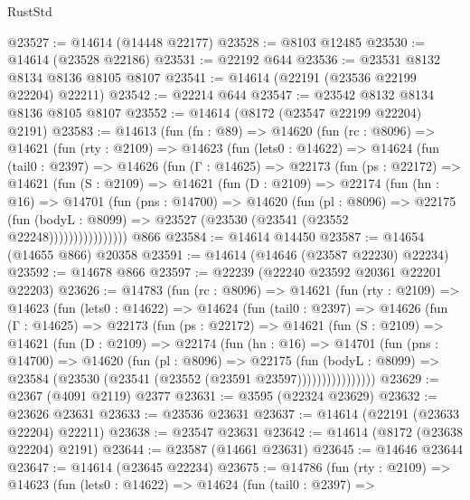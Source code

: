 \begin{lexlean}{RustStd}
\begin{coremodule}
@23527 := @14614 (@14448 @22177)
@23528 := @8103 @12485
@23530 := @14614 (@23528 @22186)
@23531 := @22192 @644
@23536 := @23531 @8132 @8134 @8136 @8105 @8107
@23541 := @14614 (@22191 (@23536 @22199 @22204) @22211)
@23542 := @22214 @644
@23547 := @23542 @8132 @8134 @8136 @8105 @8107
@23552 := @14614 (@8172 (@23547 @22199 @22204) @2191)
@23583 := @14613
    (fun (fn : @89) =>
    @14620
      (fun (rc : @8096) =>
      @14621
        (fun (rty : @2109) =>
        @14623
          (fun (lets0 : @14622) =>
          @14624
            (fun (tail0 : @2397) =>
            @14626
              (fun (Γ : @14625) =>
              @22173
                (fun (ps : @22172) =>
                @14621
                  (fun (S : @2109) =>
                  @14621
                    (fun (D : @2109) =>
                    @22174
                      (fun (hn : @16) =>
                      @14701
                        (fun (pns : @14700) =>
                        @14620
                          (fun (pl : @8096) =>
                          @22175
                            (fun (bodyL : @8099) =>
                            @23527 (@23530 (@23541 (@23552 @22248))))))))))))))))
    @866
@23584 := @14614 @14450
@23587 := @14654 (@14655 @866) @20358
@23591 := @14614 (@14646 (@23587 @22230) @22234)
@23592 := @14678 @866
@23597 := @22239 (@22240 @23592 @20361 @22201 @22203)
@23626 := @14783
    (fun (rc : @8096) =>
    @14621
      (fun (rty : @2109) =>
      @14623
        (fun (lets0 : @14622) =>
        @14624
          (fun (tail0 : @2397) =>
          @14626
            (fun (Γ : @14625) =>
            @22173
              (fun (ps : @22172) =>
              @14621
                (fun (S : @2109) =>
                @14621
                  (fun (D : @2109) =>
                  @22174
                    (fun (hn : @16) =>
                    @14701
                      (fun (pns : @14700) =>
                      @14620
                        (fun (pl : @8096) =>
                        @22175
                          (fun (bodyL : @8099) =>
                          @23584 (@23530 (@23541 (@23552 (@23591 @23597))))))))))))))))
@23629 := @2367 (@4091 @2119) @2377
@23631 := @3595 (@22324 @23629)
@23632 := @23626 @23631
@23633 := @23536 @23631
@23637 := @14614 (@22191 (@23633 @22204) @22211)
@23638 := @23547 @23631
@23642 := @14614 (@8172 (@23638 @22204) @2191)
@23644 := @23587 (@14661 @23631)
@23645 := @14646 @23644
@23647 := @14614 (@23645 @22234)
@23675 := @14786
    (fun (rty : @2109) =>
    @14623
      (fun (lets0 : @14622) =>
      @14624
        (fun (tail0 : @2397) =>

\end{coremodule}
\end{lexlean}
